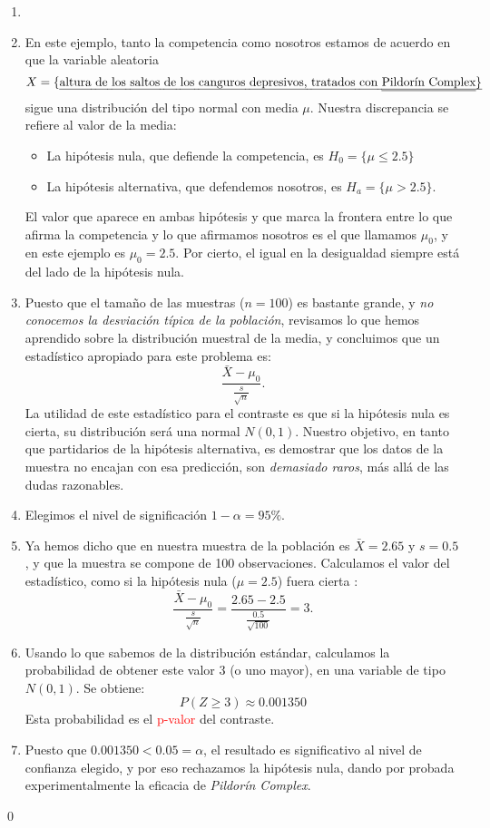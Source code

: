 \begin{itemize}
       \begin{ejemplo}

         \begin{enumerate}
         \item[]
         \item En este ejemplo, tanto la competencia como nosotros estamos de acuerdo en que la variable aleatoria
         \[X=\mbox{\{\em altura de los saltos de los canguros depresivos, tratados con {\em Pildorín Complex}\}}\]
         sigue una distribución del tipo normal con media $\mu$. Nuestra discrepancia se refiere al valor de la media:
             \begin{itemize}
             \item La hipótesis nula, que defiende la competencia, es $H_0=\{\mu\leq 2.5\}$
             \item La hipótesis alternativa, que defendemos nosotros, es $H_a=\{\mu>2.5\}$.
             \end{itemize}
            El valor que aparece en ambas hipótesis y que marca la frontera entre lo que afirma la competencia y lo que afirmamos nosotros es el que llamamos $\mu_0$, y en este ejemplo es $\mu_0=2.5$. Por cierto, el igual en la desigualdad siempre está del lado de la hipótesis nula.
         \item  Puesto que el tamaño de las muestras ($n=100$) es bastante grande, y {\em no conocemos la desviación típica de la población}, revisamos lo que hemos aprendido sobre la distribución muestral de la media, y concluimos que un estadístico apropiado para este problema es:
             \[\dfrac{\bar X-\mu_0}{\frac{s}{\sqrt{n}}}.\]
             La utilidad de este estadístico para el contraste es que {\sf si la hipótesis nula es cierta}, su distribución será una normal $N(0,1)$. Nuestro objetivo, en tanto que partidarios de la hipótesis alternativa, es demostrar que los datos de la muestra no encajan con esa predicción, son {\em demasiado raros}, más allá de las dudas razonables.
         \item Elegimos el  nivel de significación $1-\alpha=95\%$.
         \item Ya hemos dicho que en nuestra muestra de la población es $\bar X=2.65$ y $s=0.5$, y que la muestra se compone de 100 observaciones. Calculamos el valor del estadístico, como si la hipótesis nula ($\mu=2.5$) fuera cierta :
         \[\dfrac{\bar X-\mu_0}{\frac{s}{\sqrt{n}}}=\dfrac{2.65-2.5}{\frac{0.5}{\sqrt{100}}}=3.\]
         \item Usando lo que sabemos de la distribución estándar, calculamos la probabilidad de obtener este valor $3$ (o uno mayor), en una variable de tipo $N(0,1)$. Se obtiene:
          \[P(Z\geq 3)\approx 0.001350\]
          Esta probabilidad es el \textcolor{red}{p-valor} del contraste.
         \item Puesto que $0.001350<0.05=\alpha$, el resultado es significativo al nivel de confianza elegido, y por eso {\sf rechazamos la hipótesis nula}, dando por probada experimentalmente la eficacia de {\em Pildorín Complex}.
         \end{enumerate}\qed
       \end{ejemplo}


\end{itemize}

